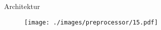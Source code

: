 \begin{frame}{Architektur}
    \begin{figure}
    	\centering
    	\texttt{[image: ./images/preprocessor/15.pdf]}
    \end{figure}
\end{frame}
